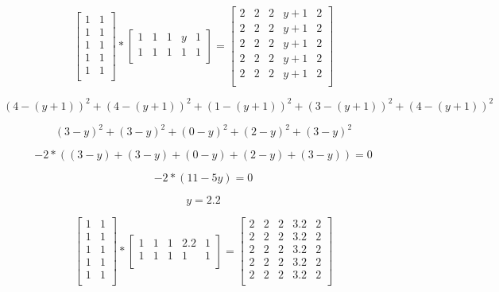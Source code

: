 \documentclass{report}
\begin{document}
\[
  \begin{bmatrix}
    1 & 1 \\
    1 & 1 \\
    1 & 1 \\
    1 & 1 \\
    1 & 1 \\
  \end{bmatrix}
  * 
  \begin{bmatrix}
    1 & 1 & 1 & y & 1 \\
    1 & 1 & 1 & 1 & 1 \\
  \end{bmatrix}
  =
  \begin{bmatrix}
    2   & 2   & 2   & y+1 & 2   \\
    2   & 2   & 2   & y+1 & 2   \\
    2   & 2   & 2   & y+1 & 2   \\
    2   & 2   & 2   & y+1 & 2   \\
    2   & 2   & 2   & y+1 & 2   \\
  \end{bmatrix}
\]

\begin{equation}
(4-(y+1))^{2}+(4-(y+1))^{2}+(1-(y+1))^{2}+(3-(y+1))^{2}+(4-(y+1))^{2}
\end{equation}

\begin{equation}
(3-y)^{2}+(3-y)^{2}+(0-y)^{2}+(2-y)^{2}+(3-y)^{2}
\end{equation}

\begin{equation}
-2 * ((3-y)+(3-y)+(0-y)+(2-y)+(3-y)) = 0
\end{equation}

\begin{equation}
-2 * (11-5y) = 0
\end{equation}

\begin{equation}
y = 2.2
\end{equation}

\[
  \begin{bmatrix}
    1 & 1 \\
    1 & 1 \\
    1 & 1 \\
    1 & 1 \\
    1 & 1 \\
  \end{bmatrix}
  * 
  \begin{bmatrix}
    1 & 1 & 1 & 2.2 & 1 \\
    1 & 1 & 1 & 1 & 1 \\
  \end{bmatrix}
  =
  \begin{bmatrix}
    2   & 2   & 2   & 3.2 & 2   \\
    2   & 2   & 2   & 3.2 & 2   \\
    2   & 2   & 2   & 3.2 & 2   \\
    2   & 2   & 2   & 3.2 & 2   \\
    2   & 2   & 2   & 3.2 & 2   \\
  \end{bmatrix}
\]
\end{document}
